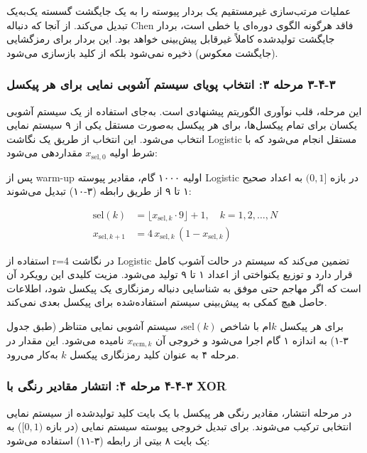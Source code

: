 عملیات مرتب‌سازی غیرمستقیم یک بردار پیوسته را به یک جایگشت گسسته یک‌به‌یک تبدیل می‌کند. از آنجا که دنباله Chen فاقد هرگونه الگوی دوره‌ای یا خطی است، بردار جایگشت تولیدشده کاملاً غیرقابل پیش‌بینی خواهد بود.  این بردار برای رمزگشایی (جایگشت معکوس) ذخیره نمی‌شود بلکه از کلید بازسازی می‌شود.

\subsubsection{‏۳‏-‏۴‏-‏۳‏ مرحله ۳: انتخاب پویای سیستم آشوبی نمایی برای هر پیکسل}

این مرحله، قلب نوآوری الگوریتم پیشنهادی است. به‌جای استفاده از یک سیستم آشوبی یکسان برای تمام پیکسل‌ها، برای هر پیکسل به‌صورت مستقل یکی از ۹ سیستم نمایی انتخاب می‌شود. این انتخاب از طریق یک نگاشت Logistic مستقل انجام می‌شود که با شرط اولیه $x_{\mathrm{sel},0}$ مقداردهی می‌شود:

پس از warm-up اولیه ۱۰۰۰ گام، مقادیر پیوسته Logistic در بازه $(0,1]$ به اعداد صحیح ۱ تا ۹ از طریق رابطه (‏۳‏-‏۱۰‏) تبدیل می‌شوند:

\begin{align}
\mathrm{sel}(k) &= \lfloor x_{\mathrm{sel},k} \cdot 9 \rfloor + 1, \quad k=1,2,\ldots,N \\
x_{\mathrm{sel},k+1} &= 4\,x_{\mathrm{sel},k}\,(1-x_{\mathrm{sel},k})

\end{align}

استفاده از r=4 در نگاشت Logistic تضمین می‌کند که سیستم در حالت آشوب کامل قرار دارد و توزیع یکنواختی از اعداد ۱ تا ۹ تولید می‌شود. مزیت کلیدی این رویکرد آن است که اگر مهاجم حتی موفق به شناسایی دنباله رمزنگاری یک پیکسل شود، اطلاعات حاصل هیچ کمکی به پیش‌بینی سیستم استفاده‌شده برای پیکسل بعدی نمی‌کند\cite{ref5}.

برای هر پیکسل $k$ام با شاخص $\mathrm{sel}(k)$، سیستم آشوبی نمایی متناظر (طبق جدول ۳-۱) به اندازه ۱ گام اجرا می‌شود و خروجی آن $x_{\mathrm{ecm},k}$ نامیده می‌شود. این مقدار در مرحله ۴ به عنوان کلید رمزنگاری پیکسل $k$ به‌کار می‌رود.

\subsubsection{‏۳‏-‏۴‏-‏۴‏ مرحله ۴: انتشار مقادیر رنگی با  XOR}

در مرحله انتشار، مقادیر رنگی هر پیکسل با یک بایت کلید تولیدشده از سیستم نمایی انتخابی ترکیب می‌شوند. برای تبدیل خروجی پیوسته سیستم نمایی (در بازه $[0,1)$) به یک بایت ۸ بیتی از رابطه (‏۳‏-‏۱۱‏) استفاده می‌شود:

